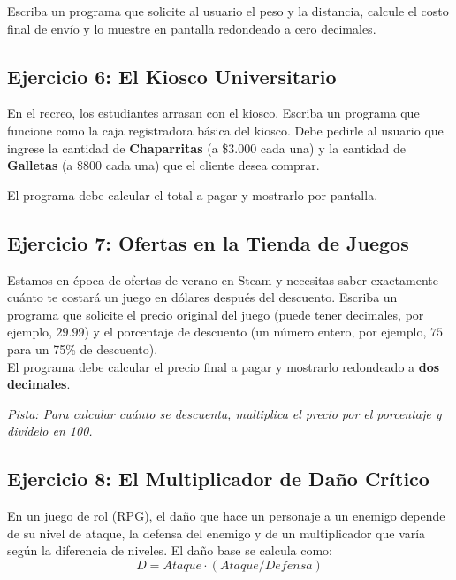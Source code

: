\documentclass[11pt, a4paper]{article}
\begin{document}
	Escriba un programa que solicite al usuario el peso y la distancia, calcule el costo final de envío y lo muestre en pantalla redondeado a cero decimales.
	
	
	\subsection*{Ejercicio 6: El Kiosco Universitario}
	
	En el recreo, los estudiantes arrasan con el kiosco. Escriba un programa que funcione como la caja registradora básica del kiosco. Debe pedirle al usuario que ingrese la cantidad de \textbf{Chaparritas} (a \$3.000 cada una) y la cantidad de \textbf{Galletas} (a \$800 cada una) que el cliente desea comprar.
	
	El programa debe calcular el total a pagar y mostrarlo por pantalla.
	
	
	\subsection*{Ejercicio 7: Ofertas en la Tienda de Juegos}
	
	Estamos en época de ofertas de verano en Steam y necesitas saber exactamente cuánto te costará un juego en dólares después del descuento. 
	Escriba un programa que solicite el precio original del juego (puede tener decimales, por ejemplo, $29.99$) y el porcentaje de descuento (un número entero, por ejemplo, $75$ para un 75\% de descuento). \\
	
	El programa debe calcular el precio final a pagar y mostrarlo redondeado a \textbf{dos decimales}.
	
	\textit{Pista: Para calcular cuánto se descuenta, multiplica el precio por el porcentaje y divídelo en 100.}
	
	
	\subsection*{Ejercicio 8: El Multiplicador de Daño Crítico}
	
	En un juego de rol (RPG), el daño que hace un personaje a un enemigo depende de su nivel de ataque, la defensa del enemigo y de un multiplicador que varía según la diferencia de niveles.
	El daño base se calcula como: $$D = Ataque \cdot (Ataque / Defensa)$$
	
\end{document}
